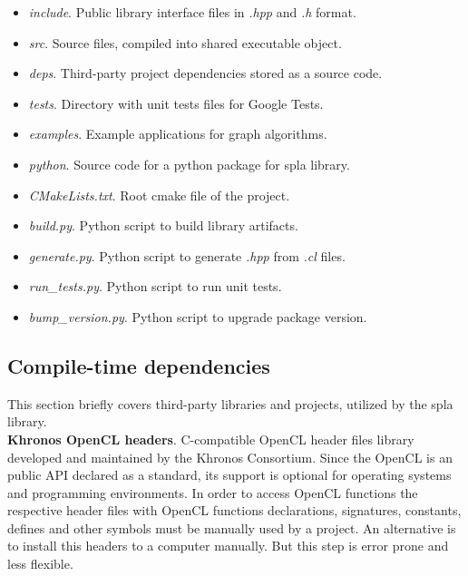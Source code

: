 \begin{itemize}[noitemsep,topsep=0pt,parsep=0pt,partopsep=0pt]
    \item {} \textit{include}. Public library interface files in \textit{.hpp} and \textit{.h} format. 
    \item {} \textit{src}. Source files, compiled into shared executable object.
    \item {} \textit{deps}. Third-party project dependencies stored as a source code.
    \item {} \textit{tests}. Directory with unit tests files for Google Tests.
    \item {} \textit{examples}. Example applications for graph algorithms.
    \item {} \textit{python}. Source code for a python package for spla library.
    \item {} \textit{CMakeLists.txt}. Root cmake file of the project.
    \item {} \textit{build.py}. Python script to build library artifacts.
    \item {} \textit{generate.py}. Python script to generate \textit{.hpp} from \textit{.cl} files.
    \item {} \textit{run\_tests.py}. Python script to run unit tests.
    \item {} \textit{bump\_version.py}. Python script to upgrade package version.
\end{itemize}

\subsection{Compile-time dependencies}

This section briefly covers third-party libraries and projects, utilized by the spla library.\\

\textbf{Khronos OpenCL headers}. C-compatible OpenCL header files library developed and maintained by the Khronos Consortium. Since the OpenCL is an public API declared as a standard, its support is optional for operating systems and programming environments. In order to access OpenCL functions the respective header files with OpenCL functions declarations, signatures, constants, defines and other symbols must be manually used by a project. An alternative is to install this headers to a computer manually. But this step is error prone and less flexible.\\

